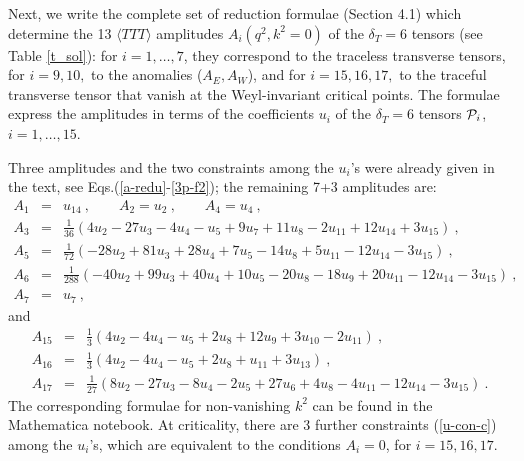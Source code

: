 \documentclass[11pt]{article}
\newcommand{\bea}{\begin{eqnarray}}
\newcommand{\eea}{\end{eqnarray}}
\def\nl{\nonumber\\}
\def\TTT{\bra TTT\ket}
\def\bra{\langle}
\def\ket{\rangle}
\def\dt{{\delta_T}} %
\begin{document}
\bigskip  

Next, we write the complete set of reduction formulae (Section 4.1) which
determine the 13 $\TTT$ amplitudes $A_i(q^2,k^2=0)$ 
of the $\dt=6$ tensors (see Table \ref{t_sol}): 
for $i=1,\dots,7$, they correspond to the traceless transverse
tensors, for $i=9,10,$ to the anomalies ($A_E,A_W$),
and for $i=15,16,17,$ to the traceful transverse tensor that
vanish at the Weyl-invariant critical points.
The formulae express the amplitudes in terms of the coefficients $u_i$
of the $\dt=6$ tensors ${\cal P}_i$, $i=1,\dots,15$.

Three amplitudes and the two constraints among the $u_i$'s were
already given in the text, see Eqs.(\ref{a-redu}-\ref{3p-f2}); 
the remaining 7+3 amplitudes are:
\bea
A_{1}&=& u_{14}\ ,\qquad A_{2} = u_{2}\ ,\qquad 
A_{4} = u_{4}\ ,\nl
A_{3}&=& \frac{1}{36}
\left( 4u_{2}-27u_{3}-4u_{4}-u_{5}+9u_{7}+11u_{8}-2u_{11}+
       12u_{14}+3u_{15} \right)\ ,\nl
A_{5}&=& \frac{1}{72}
\left(-28u_{2}+81u_{3}+28u_{4}+7u_{5}-14u_{8}+5u_{11}-12u_{14}-
       3u_{15} \right)\ ,\nl
A_{6}&=&\frac{1}{288}
\left(-40u_{2}+99u_{3}+40u_{4}+10u_{5}-20u_{8}-18u_{9}+20u_{11}-
      12u_{14}-3u_{15}\right)\ ,\nl
A_{7}&=& u_{7}\ ,
\eea
and
\bea
A_{15}&=& \frac{1}{3}
\left( 4u_{2}-4u_{4}-u_{5}+2u_{8}+12u_{9}+3u_{10}-2u_{11} \right)\ ,\nl
A_{16}&=& \frac{1}{3}
\left( 4u_{2}-4u_{4}-u_{5}+2u_{8}+u_{11}+3u_{13} \right)\ ,\nl
A_{17}&=& \frac{1}{27}
\left( 8u_{2}-27u_{3}-8u_{4}-2u_{5}+27u_{6}+4u_{8}-4u_{11}-
            12u_{14}-3u_{15} \right)\ .
\eea
The corresponding formulae for non-vanishing $k^2$ can be
found in the Mathematica notebook. 
At criticality, there are 3 further constraints (\ref{u-con-c})
among the $u_i$'s, which are equivalent to the conditions
$A_i=0$, for $i=15,16,17$.



\def\NPB#1#2#3{{\it Nucl.~Phys.} {\bf{B#1}} (#2) #3} 
\def\CMP#1#2#3{{\it Commun.~Math.~Phys.} {\bf{#1}} (#2) #3} 
\def\CQG#1#2#3{{\it Class.~Quantum~Grav.} {\bf{#1}} (#2) #3} 
\def\PLB#1#2#3{{\it Phys.~Lett.} {\bf{B#1}} (#2) #3} 
\def\PRD#1#2#3{{\it Phys.~Rev.} {\bf{D#1}} (#2) #3} 
\def\PRL#1#2#3{{\it Phys.~Rev.~Lett.} {\bf{#1}} (#2) #3} 
\def\ZPC#1#2#3{{\it Z.~Phys.} {\bf C#1} (#2) #3} 
\def\PTP#1#2#3{{\it Prog.~Theor.~Phys.} {\bf#1}  (#2) #3} 
\def\MPLA#1#2#3{{\it Mod.~Phys.~Lett.} {\bf#1} (#2) #3} 
\def\PR#1#2#3{{\it Phys.~Rep.} {\bf#1} (#2) #3} 
\def\AP#1#2#3{{\it Ann.~Phys.} {\bf#1} (#2) #3} 
\def\RMP#1#2#3{{\it Rev.~Mod.~Phys.} {\bf#1} (#2) #3} 
\def\HPA#1#2#3{{\it Helv.~Phys.~Acta} {\bf#1} (#2) #3} 
\def\JETPL#1#2#3{{\it JETP~Lett.} {\bf#1} (#2) #3} 
\def\JHEP#1#2#3{{\it JHEP} {\bf#1} (#2) #3} 
\def\TH#1{{\tt hep-th/#1}} 
 
\end{document}
